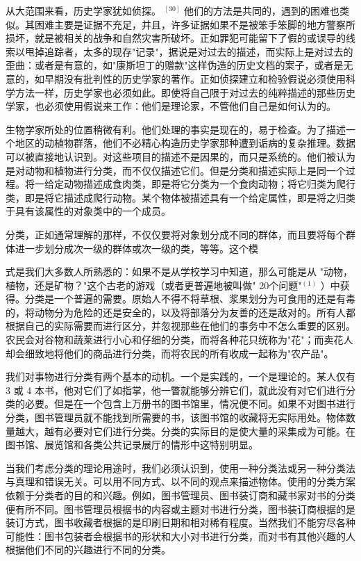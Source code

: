 从大范围来看，历史学家犹如侦探。 ${ }^{[30]}$ 他们的方法是共同的，遇到的困难也类似。其困难主要是证据不充足，并且，许多证据如果不是被笨手笨脚的地方警察所损坏，就是被相关的战争和自然灾害所破坏。正如罪犯可能留下了假的或误导的线索以甩掉追踪者，太多的现存"记录"，据说是对过去的描述，而实际上是对过去的歪曲：或者是有意的，如"康斯坦丁的赠款"这样伪造的历史文档的案子，或者是无意的，如早期没有批判性的历史学家的著作。正如侦探建立和检验假说必须使用科学方法一样，历史学家也必须如此。即使将自己限于对过去的纯粹描述的那些历史学家，也必须使用假说来工作：他们是理论家，不管他们自己是如何认为的。

生物学家所处的位置稍微有利。他们处理的事实是现在的，易于检查。为了描述一个地区的动植物群落，他们不必精心构造历史学家那种遭到诟病的复杂推理。数据可以被直接地认识到。对这些项目的描述不是因果的，而只是系统的。他们被认为是对动物和植物进行分类，而不仅仅描述它们。但是分类和描述实际上是同一个过程。将一给定动物描述成食肉类，即是将它分类为一个食肉动物；将它归类为爬行类，即是将它描述成爬行动物。某个物体被描述具有一个给定属性，即是将之归类于具有该属性的对象类中的一个成员。

分类，正如通常理解的那样，不仅仅要将对象划分成不同的群体，而且要将每个群体进一步划分成次一级的群体或次一级的类，等等。这个模

式是我们大多数人所熟悉的：如果不是从学校学习中知道，那么可能是从 "动物，植物，还是矿物？"这个古老的游戏（或者更普遍地被叫做" 20个问题"${ }^{(1)}$ ）中获得。分类是一个普遍的需要。原始人不得不将草根、浆果划分为可食用的还是有毒的，将动物分为危险的还是安全的，以及将部落分为友善的还是敌对的。所有人都根据自己的实际需要而进行区分，并忽视那些在他们的事务中不怎么重要的区别。农民会对谷物和蔬莱进行小心和仔细的分类，而将各种花只统称为"花"；而卖花人却会细致地将他们的商品进行分类，而将农民的所有收成一起称为"农产品"。

我们对事物进行分类有两个基本的动机。一个是实践的，一个是理论的。某人仅有 3 或 4 本书，他对它们了如指掌，他一瞥就能够分辨它们，就此没有对它们进行分类的必要。但是在一个包含上万册书的图书馆里，情况便不同。如果不对图书进行分类，图书管理员就不能找到所需要的书，该图书馆的收藏将无实际用处。物体数量越大，越有必要对它们进行分类。分类的实际目的是使大量的采集成为可能。在图书馆、展览馆和各类公共记录展厅的情形中这特别明显。

当我们考虑分类的理论用途时，我们必须认识到，使用一种分类法或另一种分类法与真理和错误无关。可以用不同方式、以不同的观点来描述物体。使用的分类方案依赖于分类者的目的和兴趣。例如，图书管理员、图书装订商和藏书家对书的分类便有所不同。图书管理员根据书的内容或主题对书进行分类，图书装订商根据的是装订方式，图书收藏者根据的是印刷日期和相对稀有程度。当然我们不能穷尽各种可能性：图书包装者会根据书的形状和大小对书进行分类，而对书有其他兴趣的人根据他们不同的兴趣进行不同的分类。


